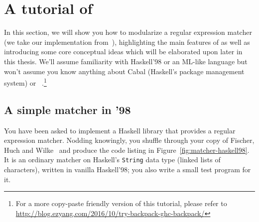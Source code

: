 \chapter{A tutorial of \Backpack{}}
\label{sec:tour}


In this section, we will show you how to modularize a
regular expression matcher
(we take our implementation from~\cite{Fischer:2010:PRE:1863543.1863594}),
highlighting the main
features of \Backpack{} as well as introducing some core conceptual
ideas which will be elaborated upon later in this thesis.  We'll assume
familiarity with Haskell'98 or an ML-like language but won't assume you
know anything about Cabal (Haskell's package management system) or
\OldBackpack{}~\cite{backpack}.\footnote{For a more copy-paste friendly
version of this tutorial, please refer to \url{http://blog.ezyang.com/2016/10/try-backpack-ghc-backpack/}}

\section{A simple matcher in '98}

You have been asked to implement a Haskell library that provides a
regular expression matcher.  Nodding knowingly, you shuffle through your
copy of Fischer, Huch and Wilke~\cite{Fischer:2010:PRE:1863543.1863594}
and produce the code listing in Figure~\ref{fig:matcher-haskell98}.  It
is an ordinary matcher on Haskell's \verb|String| data type
(linked lists of characters), written in vanilla
Haskell'98; you also write a small test program for it.


